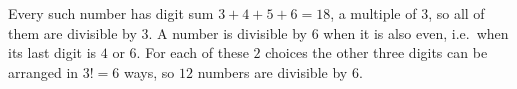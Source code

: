 Every such number has digit sum $3+4+5+6=18$, a multiple of $3$, so all of them are divisible by $3$. A number is divisible by $6$ when it is also even, i.e.\ when its last digit is $4$ or $6$. For each of these $2$ choices the other three digits can be arranged in $3!=6$ ways, so $\boxed{12}$ numbers are divisible by $6$.
